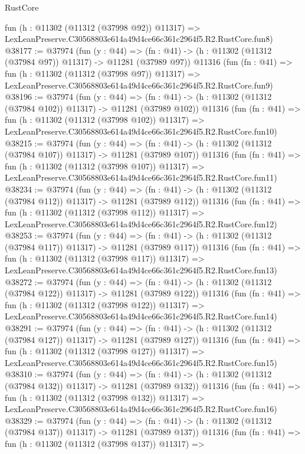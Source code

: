 \begin{lexlean}{RustCore}
\begin{coremodule}
    fun (h : @11302 (@11312 (@37998 @92)) @11317) =>
    LexLeanPreserve.C30568803e614a49d4ce66c361c2964f5.R2.RustCore.fun8)
@38177 := @37974
    (fun (y : @44) =>
    (fn : @41) -> (h : @11302 (@11312 (@37984 @97)) @11317) -> @11281 (@37989 @97))
    @11316
    (fun (fn : @41) =>
    fun (h : @11302 (@11312 (@37998 @97)) @11317) =>
    LexLeanPreserve.C30568803e614a49d4ce66c361c2964f5.R2.RustCore.fun9)
@38196 := @37974
    (fun (y : @44) =>
    (fn : @41) -> (h : @11302 (@11312 (@37984 @102)) @11317) -> @11281 (@37989 @102))
    @11316
    (fun (fn : @41) =>
    fun (h : @11302 (@11312 (@37998 @102)) @11317) =>
    LexLeanPreserve.C30568803e614a49d4ce66c361c2964f5.R2.RustCore.fun10)
@38215 := @37974
    (fun (y : @44) =>
    (fn : @41) -> (h : @11302 (@11312 (@37984 @107)) @11317) -> @11281 (@37989 @107))
    @11316
    (fun (fn : @41) =>
    fun (h : @11302 (@11312 (@37998 @107)) @11317) =>
    LexLeanPreserve.C30568803e614a49d4ce66c361c2964f5.R2.RustCore.fun11)
@38234 := @37974
    (fun (y : @44) =>
    (fn : @41) -> (h : @11302 (@11312 (@37984 @112)) @11317) -> @11281 (@37989 @112))
    @11316
    (fun (fn : @41) =>
    fun (h : @11302 (@11312 (@37998 @112)) @11317) =>
    LexLeanPreserve.C30568803e614a49d4ce66c361c2964f5.R2.RustCore.fun12)
@38253 := @37974
    (fun (y : @44) =>
    (fn : @41) -> (h : @11302 (@11312 (@37984 @117)) @11317) -> @11281 (@37989 @117))
    @11316
    (fun (fn : @41) =>
    fun (h : @11302 (@11312 (@37998 @117)) @11317) =>
    LexLeanPreserve.C30568803e614a49d4ce66c361c2964f5.R2.RustCore.fun13)
@38272 := @37974
    (fun (y : @44) =>
    (fn : @41) -> (h : @11302 (@11312 (@37984 @122)) @11317) -> @11281 (@37989 @122))
    @11316
    (fun (fn : @41) =>
    fun (h : @11302 (@11312 (@37998 @122)) @11317) =>
    LexLeanPreserve.C30568803e614a49d4ce66c361c2964f5.R2.RustCore.fun14)
@38291 := @37974
    (fun (y : @44) =>
    (fn : @41) -> (h : @11302 (@11312 (@37984 @127)) @11317) -> @11281 (@37989 @127))
    @11316
    (fun (fn : @41) =>
    fun (h : @11302 (@11312 (@37998 @127)) @11317) =>
    LexLeanPreserve.C30568803e614a49d4ce66c361c2964f5.R2.RustCore.fun15)
@38310 := @37974
    (fun (y : @44) =>
    (fn : @41) -> (h : @11302 (@11312 (@37984 @132)) @11317) -> @11281 (@37989 @132))
    @11316
    (fun (fn : @41) =>
    fun (h : @11302 (@11312 (@37998 @132)) @11317) =>
    LexLeanPreserve.C30568803e614a49d4ce66c361c2964f5.R2.RustCore.fun16)
@38329 := @37974
    (fun (y : @44) =>
    (fn : @41) -> (h : @11302 (@11312 (@37984 @137)) @11317) -> @11281 (@37989 @137))
    @11316
    (fun (fn : @41) =>
    fun (h : @11302 (@11312 (@37998 @137)) @11317) =>

\end{coremodule}
\end{lexlean}
